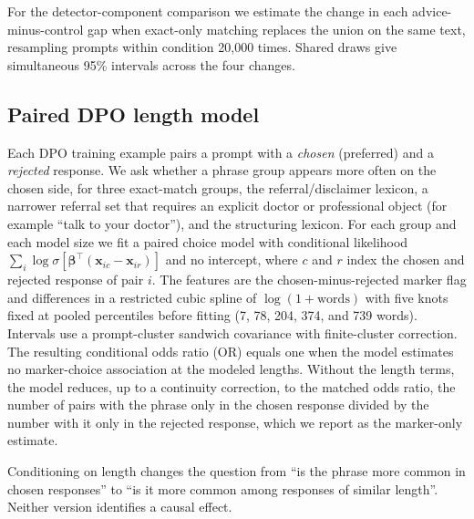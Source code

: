 \documentclass[11pt]{article}
\newif\ifpivot
\begin{document}
For the detector-component comparison we estimate the change in each
advice-minus-control gap when exact-only matching replaces the union on the
same text, resampling prompts within condition 20,000 times. Shared draws
give simultaneous 95\% intervals across the four changes.

\subsection{Paired DPO length model}
\label{sec:method-dpo-conditional}
Each DPO training example pairs a prompt with a \emph{chosen} (preferred)
and a \emph{rejected} response. We ask whether a phrase group appears more
often on the chosen side, for three exact-match groups, the
referral/disclaimer lexicon, a narrower referral set that requires an
explicit doctor or professional object (for example ``talk to your
doctor''), and the structuring lexicon. For each group and each model size
we fit a paired
choice model with conditional likelihood
$\sum_i\log\sigma[\boldsymbol\beta^\top(\mathbf{x}_{ic}-\mathbf{x}_{ir})]$
and no intercept, where $c$ and $r$ index the chosen and rejected response of
pair $i$. The features are the chosen-minus-rejected marker flag and
differences in a restricted cubic spline of $\log(1+\text{words})$ with five
knots fixed at pooled percentiles before fitting (7, 78, 204, 374, and 739
words). Intervals use a prompt-cluster sandwich covariance with finite-cluster
correction. The resulting conditional odds ratio (OR) equals one when the
model estimates no marker-choice association at the modeled lengths. Without
the length terms, the model reduces, up to a continuity correction, to the
matched odds ratio, the number of pairs with the phrase only in the chosen
response divided by the number with it only in the rejected response, which we report as the marker-only
estimate.

Conditioning on length changes the question from ``is the phrase more
common in chosen responses'' to ``is it more common among responses of
similar length''. Neither version identifies a causal effect.

\ifpivot
\end{document}
